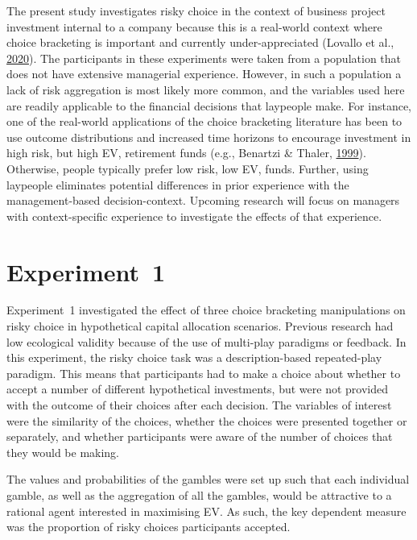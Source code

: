 \documentclass[
  english,
  man, donotrepeattitle,floatsintext]{apa7}
\theoremstyle{definition}
\theoremstyle{definition}
\theoremstyle{definition}
\theoremstyle{definition}
\theoremstyle{remark}
\begin{document}
The present study investigates risky choice in the context of business project
investment internal to a company because this is a real-world context where
choice bracketing is important and currently under-appreciated (Lovallo et al., \protect\hyperlink{ref-lovallo2020}{2020}).
The participants in these experiments were taken from a population that does not
have extensive managerial experience. However, in such a population a lack of
risk aggregation is most likely more common, and the variables used here are
readily applicable to the financial decisions that laypeople make. For instance,
one of the real-world applications of the choice bracketing literature has been
to use outcome distributions and increased time horizons to encourage investment
in high risk, but high EV, retirement funds (e.g., Benartzi \& Thaler, \protect\hyperlink{ref-benartzi1999}{1999}). Otherwise,
people typically prefer low risk, low EV, funds. Further, using laypeople
eliminates potential differences in prior experience with the management-based
decision-context. Upcoming research will focus on managers with context-specific
experience to investigate the effects of that experience.

\hypertarget{aggregation-1}{%
\section{Experiment~1}\label{aggregation-1}}

Experiment~1 investigated the effect of three choice bracketing manipulations on
risky choice in hypothetical capital allocation scenarios. Previous research
had low ecological validity because of the use of multi-play paradigms or
feedback. In this experiment, the risky choice task was a description-based
repeated-play paradigm. This means that participants had to make a choice about
whether to accept a number of different hypothetical investments, but were not
provided with the outcome of their choices after each decision. The variables of
interest were the similarity of the choices, whether the choices were presented
together or separately, and whether participants were aware of the number of
choices that they would be making.

The values and probabilities of the gambles were set up such that each
individual gamble, as well as the aggregation of all the gambles, would be
attractive to a rational agent interested in maximising EV. As such, the key
dependent measure was the proportion of risky choices participants accepted.
\end{document}
